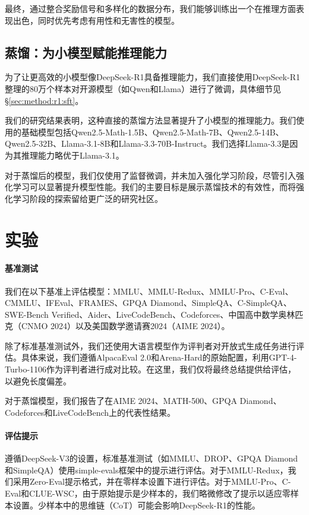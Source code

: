 \documentclass[lang=cn,a4paper,newtx]{elegantpaper}
\newcommand{\dsri}{DeepSeek-R1}
\begin{document}
最终，通过整合奖励信号和多样化的数据分布，我们能够训练出一个在推理方面表现出色，同时优先考虑有用性和无害性的模型。

\subsection{蒸馏：为小模型赋能推理能力}

为了让更高效的小模型像\dsri{}具备推理能力，我们直接使用\dsri{}整理的80万个样本对开源模型（如Qwen和Llama）进行了微调，具体细节见\S \ref{sec:method:r1:sft}。

我们的研究结果表明，这种直接的蒸馏方法显著提升了小模型的推理能力。我们使用的基础模型包括Qwen2.5-Math-1.5B、Qwen2.5-Math-7B、Qwen2.5-14B、Qwen2.5-32B、Llama-3.1-8B和Llama-3.3-70B-Instruct。我们选择Llama-3.3是因为其推理能力略优于Llama-3.1。

对于蒸馏后的模型，我们仅使用了监督微调，并未加入强化学习阶段，尽管引入强化学习可以显著提升模型性能。我们的主要目标是展示蒸馏技术的有效性，而将强化学习阶段的探索留给更广泛的研究社区。

\section{实验}

\paragraph{基准测试} 我们在以下基准上评估模型：MMLU、MMLU-Redux、MMLU-Pro、C-Eval、CMMLU、IFEval、FRAMES、GPQA Diamond、SimpleQA、C-SimpleQA、SWE-Bench Verified、Aider、LiveCodeBench、Codeforces、中国高中数学奥林匹克（CNMO 2024）以及美国数学邀请赛2024（AIME 2024）。

除了标准基准测试外，我们还使用大语言模型作为评判者对开放式生成任务进行评估。具体来说，我们遵循AlpacaEval 2.0和Arena-Hard的原始配置，利用GPT-4-Turbo-1106作为评判者进行成对比较。在这里，我们仅将最终总结提供给评估，以避免长度偏差。

对于蒸馏模型，我们报告了在AIME 2024、MATH-500、GPQA Diamond、Codeforces和LiveCodeBench上的代表性结果。

\paragraph{评估提示} 遵循DeepSeek-V3的设置，标准基准测试（如MMLU、DROP、GPQA Diamond和SimpleQA）使用simple-evals框架中的提示进行评估。对于MMLU-Redux，我们采用Zero-Eval提示格式，并在零样本设置下进行评估。对于MMLU-Pro、C-Eval和CLUE-WSC，由于原始提示是少样本的，我们略微修改了提示以适应零样本设置。少样本中的思维链（CoT）可能会影响\dsri{}的性能。
\end{document}
